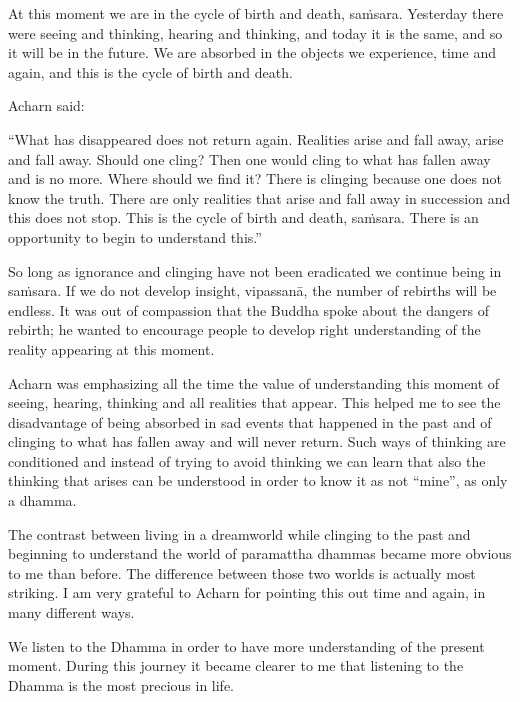 At this moment we are in the cycle of birth and death, saṁsara.
Yesterday there were seeing and thinking, hearing and thinking, and
today it is the same, and so it will be in the future. We are absorbed
in the objects we experience, time and again, and this is the cycle of
birth and death.

Acharn said:

``What has disappeared does not return again. Realities arise and fall
away, arise and fall away. Should one cling? Then one would cling to
what has fallen away and is no more. Where should we find it? There is
clinging because one does not know the truth. There are only realities
that arise and fall away in succession and this does not stop. This is
the cycle of birth and death, saṁsara. There is an opportunity to begin
to understand this.''

So long as ignorance and clinging have not been eradicated we continue
being in saṁsara. If we do not develop insight, vipassanā, the number of
rebirths will be endless. It was out of compassion that the Buddha spoke
about the dangers of rebirth; he wanted to encourage people to develop
right understanding of the reality appearing at this moment.

Acharn was emphasizing all the time the value of understanding this
moment of seeing, hearing, thinking and all realities that appear. This
helped me to see the disadvantage of being absorbed in sad events that
happened in the past and of clinging to what has fallen away and will
never return. Such ways of thinking are conditioned and instead of
trying to avoid thinking we can learn that also the thinking that arises
can be understood in order to know it as not ``mine'', as only a dhamma.

The contrast between living in a dreamworld while clinging to the past
and beginning to understand the world of paramattha dhammas became more
obvious to me than before. The difference between those two worlds is
actually most striking. I am very grateful to Acharn for pointing this
out time and again, in many different ways.

We listen to the Dhamma in order to have more understanding of the
present moment. During this journey it became clearer to me that
listening to the Dhamma is the most precious in life.


